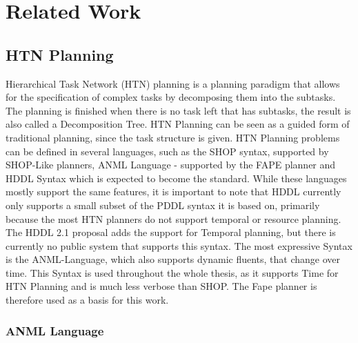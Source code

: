 \section{Related Work}\label{sec:related-work}


\subsection{HTN Planning}\label{sec:htn-planning}

Hierarchical Task Network (HTN) planning is a planning paradigm that allows for the specification of complex tasks by decomposing them into the subtasks.
The planning is finished when there is no task left that has subtasks, the result is also called a Decomposition Tree.
HTN Planning can be seen as a guided form of traditional planning, since the task structure is given.
HTN Planning problems can be defined in several languages, such as the SHOP syntax, supported by SHOP-Like planners, ANML Language - supported by the FAPE planner and HDDL Syntax which is expected to become the standard.
While these languages mostly support the same features, it is important to note that HDDL currently only supports a small subset of the PDDL syntax it is based on, primarily because the most HTN planners do not support temporal or resource planning.
The HDDL 2.1 proposal adds the support for Temporal planning, but there is currently no public system that supports this syntax.
The most expressive Syntax is the ANML-Language, which also supports dynamic fluents, that change over time.
This Syntax is used throughout the whole thesis, as it supports Time for HTN Planning and is much less verbose than SHOP.
The Fape planner is therefore used as a basis for this work.

\subsubsection{ANML Language}

